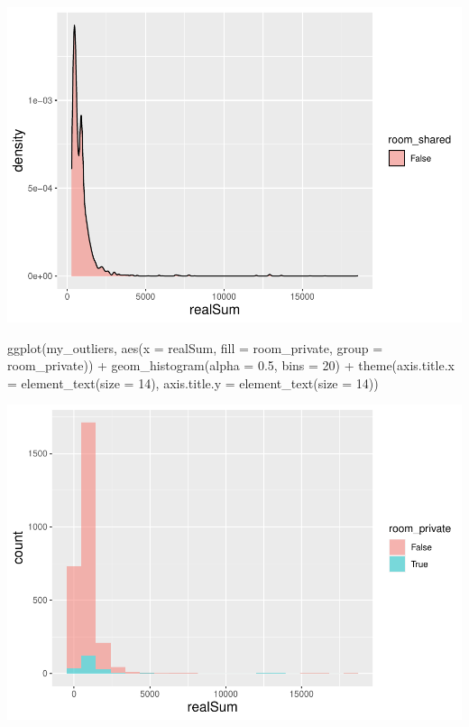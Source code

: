 \documentclass[
]{article}
\newenvironment{Shaded}{\begin{snugshade}}{\end{snugshade}}
\newcommand{\AttributeTok}[1]{\textcolor[rgb]{0.77,0.63,0.00}{#1}}
\newcommand{\DecValTok}[1]{\textcolor[rgb]{0.00,0.00,0.81}{#1}}
\newcommand{\FloatTok}[1]{\textcolor[rgb]{0.00,0.00,0.81}{#1}}
\newcommand{\FunctionTok}[1]{\textcolor[rgb]{0.00,0.00,0.00}{#1}}
\newcommand{\NormalTok}[1]{#1}
\newcommand{\SpecialCharTok}[1]{\textcolor[rgb]{0.00,0.00,0.00}{#1}}
\begin{document}
\includegraphics{Project_files/figure-latex/unnamed-chunk-12-1.pdf}

\begin{Shaded}
\begin{Highlighting}[]
\FunctionTok{ggplot}\NormalTok{(my\_outliers, }\FunctionTok{aes}\NormalTok{(}\AttributeTok{x =}\NormalTok{ realSum, }\AttributeTok{fill =}\NormalTok{ room\_private, }\AttributeTok{group =}\NormalTok{ room\_private)) }\SpecialCharTok{+}
    \FunctionTok{geom\_histogram}\NormalTok{(}\AttributeTok{alpha =} \FloatTok{0.5}\NormalTok{, }\AttributeTok{bins =} \DecValTok{20}\NormalTok{) }\SpecialCharTok{+} \FunctionTok{theme}\NormalTok{(}\AttributeTok{axis.title.x =} \FunctionTok{element\_text}\NormalTok{(}\AttributeTok{size =} \DecValTok{14}\NormalTok{),}
    \AttributeTok{axis.title.y =} \FunctionTok{element\_text}\NormalTok{(}\AttributeTok{size =} \DecValTok{14}\NormalTok{))}
\end{Highlighting}
\end{Shaded}

\includegraphics{Project_files/figure-latex/unnamed-chunk-13-1.pdf}
\end{document}
